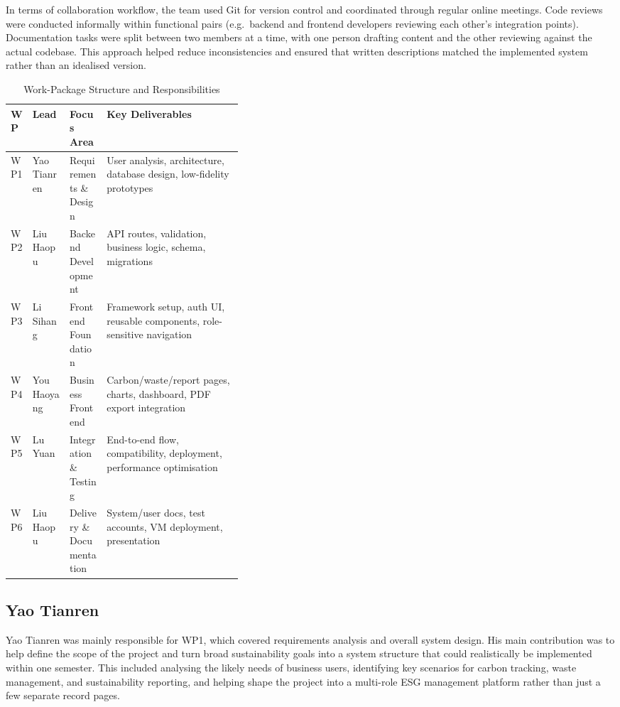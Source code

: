 \documentclass[11pt,a4paper]{article}
\begin{document}
In terms of collaboration workflow, the team used Git for version control and coordinated through regular online meetings. Code reviews were conducted informally within functional pairs (e.g.\ backend and frontend developers reviewing each other's integration points). Documentation tasks were split between two members at a time, with one person drafting content and the other reviewing against the actual codebase. This approach helped reduce inconsistencies and ensured that written descriptions matched the implemented system rather than an idealised version.

\begin{table}[h]
\centering
\scriptsize
\begin{tabularx}{\linewidth}{@{}p{0.06\linewidth}p{0.16\linewidth}p{0.16\linewidth}X@{}}
\toprule
\textbf{WP} & \textbf{Lead} & \textbf{Focus Area} & \textbf{Key Deliverables} \\
\midrule
WP1 & Yao Tianren   & Requirements \& Design  & User analysis, architecture, database design, low-fidelity prototypes \\
WP2 & Liu Haopu     & Backend Development     & API routes, validation, business logic, schema, migrations \\
WP3 & Li Sihang     & Frontend Foundation     & Framework setup, auth UI, reusable components, role-sensitive navigation \\
WP4 & You Haoyang   & Business Frontend       & Carbon/waste/report pages, charts, dashboard, PDF export integration \\
WP5 & Lu Yuan       & Integration \& Testing  & End-to-end flow, compatibility, deployment, performance optimisation \\
WP6 & Liu Haopu     & Delivery \& Documentation & System/user docs, test accounts, VM deployment, presentation \\
\bottomrule
\end{tabularx}
\caption{Work-Package Structure and Responsibilities}
\end{table}

\subsection{Yao Tianren}
Yao Tianren was mainly responsible for WP1, which covered requirements analysis and overall system design. His main contribution was to help define the scope of the project and turn broad sustainability goals into a system structure that could realistically be implemented within one semester. This included analysing the likely needs of business users, identifying key scenarios for carbon tracking, waste management, and sustainability reporting, and helping shape the project into a multi-role ESG management platform rather than just a few separate record pages.
\end{document}
